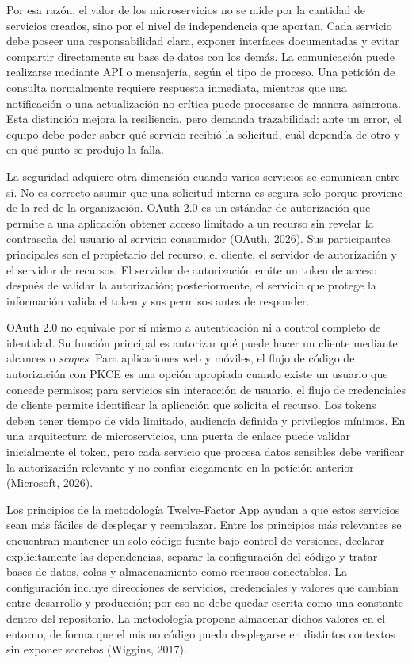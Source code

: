 \documentclass[12pt,letterpaper]{article}
\begin{document}
Por esa razón, el valor de los microservicios no se mide por la cantidad de servicios creados, sino por el nivel de independencia que aportan. Cada servicio debe poseer una responsabilidad clara, exponer interfaces documentadas y evitar compartir directamente su base de datos con los demás. La comunicación puede realizarse mediante API o mensajería, según el tipo de proceso. Una petición de consulta normalmente requiere respuesta inmediata, mientras que una notificación o una actualización no crítica puede procesarse de manera asíncrona. Esta distinción mejora la resiliencia, pero demanda trazabilidad: ante un error, el equipo debe poder saber qué servicio recibió la solicitud, cuál dependía de otro y en qué punto se produjo la falla.

La seguridad adquiere otra dimensión cuando varios servicios se comunican entre sí. No es correcto asumir que una solicitud interna es segura solo porque proviene de la red de la organización. OAuth 2.0 es un estándar de autorización que permite a una aplicación obtener acceso limitado a un recurso sin revelar la contraseña del usuario al servicio consumidor (OAuth, 2026). Sus participantes principales son el propietario del recurso, el cliente, el servidor de autorización y el servidor de recursos. El servidor de autorización emite un token de acceso después de validar la autorización; posteriormente, el servicio que protege la información valida el token y sus permisos antes de responder.

OAuth 2.0 no equivale por sí mismo a autenticación ni a control completo de identidad. Su función principal es autorizar qué puede hacer un cliente mediante alcances o \textit{scopes}. Para aplicaciones web y móviles, el flujo de código de autorización con PKCE es una opción apropiada cuando existe un usuario que concede permisos; para servicios sin interacción de usuario, el flujo de credenciales de cliente permite identificar la aplicación que solicita el recurso. Los tokens deben tener tiempo de vida limitado, audiencia definida y privilegios mínimos. En una arquitectura de microservicios, una puerta de enlace puede validar inicialmente el token, pero cada servicio que procesa datos sensibles debe verificar la autorización relevante y no confiar ciegamente en la petición anterior (Microsoft, 2026).

Los principios de la metodología Twelve-Factor App ayudan a que estos servicios sean más fáciles de desplegar y reemplazar. Entre los principios más relevantes se encuentran mantener un solo código fuente bajo control de versiones, declarar explícitamente las dependencias, separar la configuración del código y tratar bases de datos, colas y almacenamiento como recursos conectables. La configuración incluye direcciones de servicios, credenciales y valores que cambian entre desarrollo y producción; por eso no debe quedar escrita como una constante dentro del repositorio. La metodología propone almacenar dichos valores en el entorno, de forma que el mismo código pueda desplegarse en distintos contextos sin exponer secretos (Wiggins, 2017).
\end{document}
